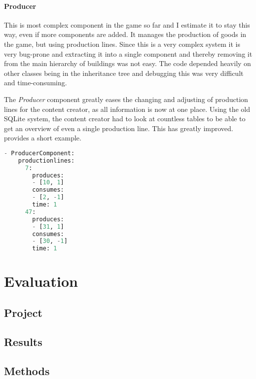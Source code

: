 \paragraph{Producer}
This is most complex component in the game so far and I estimate it to stay this way, even if more components are added.
It manages the production of goods in the game, but using production lines. Since this is a very complex system it is
very bug-prone and extracting it into a single component and thereby removing it from the main hierarchy of buildings
was not easy. The code depended heavily on other classes being in the inheritance tree and debugging this was very
difficult and time-consuming.

The \textit{Producer} component greatly eases the changing and adjusting of production lines for the content creator, as
all information is now at one place. Using the old SQLite system, the content creator had to look at countless tables to
be able to get an overview of even a single production line. This has greatly improved.  provides a short
example.

\begin{lstlisting}[language=python,caption=YAML representation of the Producer with two production lines,
label=produceryaml]
- ProducerComponent:
    productionlines:
      7:
        produces:
        - [10, 1]
        consumes:
        - [2, -1]
        time: 1
      47:
        produces:
        - [31, 1]
        consumes:
        - [30, -1]
        time: 1
\end{lstlisting}



\section{Evaluation}
\subsection{Project}
\subsection{Results}
\subsection{Methods}
